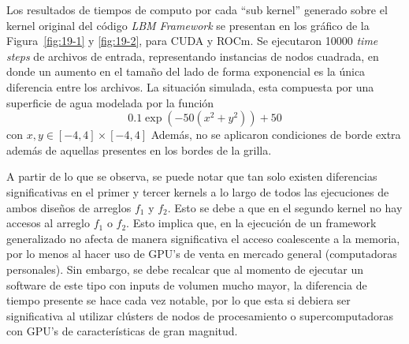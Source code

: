 Los resultados de tiempos de computo por cada ``sub kernel'' generado sobre el kernel original del código \textit{LBM Framework} se presentan en los gráfico de la Figura~\ref{fig:19-1} y \ref{fig:19-2}, para CUDA y ROCm.
Se ejecutaron 10000 \textit{time steps} de archivos de entrada, representando instancias de nodos cuadrada, en donde un aumento en el tamaño del lado de forma exponencial es la única diferencia entre los archivos.
La situación simulada, esta compuesta por una superficie de agua modelada por la función
\begin{equation*}
    0.1\exp\left(-50(x^2 + y^2)\right) + 50
\end{equation*}
con $x,y \in [-4,4]\times[-4,4]$
Además, no se aplicaron condiciones de borde extra además de aquellas presentes en los bordes de la grilla.

A partir de lo que se observa, se puede notar que tan solo existen diferencias significativas en el primer y tercer kernels a lo largo de todos las ejecuciones de ambos diseños de arreglos \(f_1\) y \(f_2\).
Esto se debe a que en el segundo kernel no hay accesos al arreglo \(f_1\) o \(f_2\).
Esto implica que, en la ejecución de un framework generalizado no afecta de manera significativa el acceso coalescente a la memoria, por lo menos al hacer uso de GPU's de venta en mercado general (computadoras personales).
Sin embargo, se debe recalcar que al momento de ejecutar un software de este tipo con inputs de volumen mucho mayor, la diferencia de tiempo presente se hace cada vez notable, por lo que esta si debiera ser significativa al utilizar clústers de nodos de procesamiento o supercomputadoras con GPU's de características de gran magnitud.


